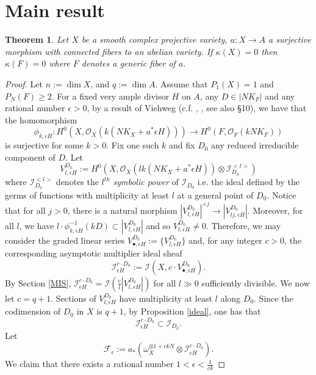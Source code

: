 \documentclass[10pt, a4paper]{amsart}
\newtheorem{thm}{Theorem}[section]
\newcommand\lra{\longrightarrow}
\newcommand\ot{{\otimes}}
\newcommand\OO{{\mathcal{O}}}
\newcommand\FF{{\mathcal{F}}}
\newcommand\II{{\mathcal{I}}}
\begin{document}
\section{Main result}
\begin{thm} \label{T1}
Let $X$ be a smooth complex projective variety, $a:X\lra A$ a surjective
morphism with connected fibers to an abelian variety. If $\kappa (X)=0$
then $\kappa (F)=0$ where $F$ denotes a generic fiber of $a$.
\end{thm}
\begin{proof}
Let $n:=\dim X$, and $q:=\dim A$.
Assume that $P_1(X)=1$ and $P_N(F)\geq 2$.
For a fixed very ample divisor $H$ on $A$, any $D\in |NK_F|$ and
any rational number $\epsilon>0$, 
by a result of Viehweg (c.f. \cite{V1}, \cite{V2}, see also \cite{Ko2} \S 10),
we have that the homomorphism
$$
\phi _{k,\epsilon H}:
H^0(X,\OO _X(k(NK_X+a^*\epsilon H)))\lra H^0(F,\OO _F
(kNK_F))$$ is surjective for some $k> 0$.
Fix one such $k$ and fix $D_0$ any reduced irreducible component of $D$.
Let $$V _{l,\epsilon H}^{D_0}:=H^0(X,\OO _X
(lk(NK_X+a^*\epsilon H))\ot \II _{D_0}^{<l>})$$
where $\II ^{<l>}_{D_0}$ denotes the $l^{th}$ {\it symbolic power} of $\II _{D_0}$
i.e. the ideal defined by the germs of functions with multiplicity
at least $l$ at a general point of $D_0$.
Notice that for all $j>0$, there is a natural morphism
$|V^{D_0}_{l, \epsilon H}|^{\times j}\lra |V^{D_0}_{lj,\epsilon H}|$.
Moreover, for all $l$, we have
$l\cdot \phi _{k,\epsilon H}^{-1}(kD)\subset |V _{l,\epsilon H}^{D_0}|$ and so 
$V _{l,\epsilon H}^{D_0}\ne 0$.
Therefore, we may consider the graded linear series
$V^{D_0}_{\bullet, \epsilon H}:=\{ V^{D_0}_{l,\epsilon H} \}$
and, for any integer $c>0$, the corresponding asymptotic multiplier ideal sheaf
$$\II ^{c\cdot D_0}_{\epsilon H}:=\II (X,c\cdot V^{D_0}_{\bullet, \epsilon H})
.$$
By Section \ref{MIS}, $\II ^{c\cdot {D_0}}_{\epsilon H}=
\II (\frac{c}{l}|V^{D_0}_{l,\epsilon H}|) $
for all $l\gg 0$ sufficiently divisible.
We now let $c=q+1$. Sections of $V^{D_0}_{l,\epsilon H}$ have multiplicity at least
$l$ along $D_0$. Since the codimension of $D_0$ in $X$ is $q+1$,
by Proposition \ref{ideal},
one has that $$\II ^{c\cdot {D_0}}_{\epsilon H}\subset \II _{D_0}.$$
Let $$\FF _\epsilon :=a_*(\omega _X ^{\ot 1+ckN}\ot 
\II ^{c\cdot {D_0}}_{\epsilon H}).$$
We claim that there exists a rational number $1<\epsilon <\frac {1}{ck}$

\end{proof}
\end{document}
